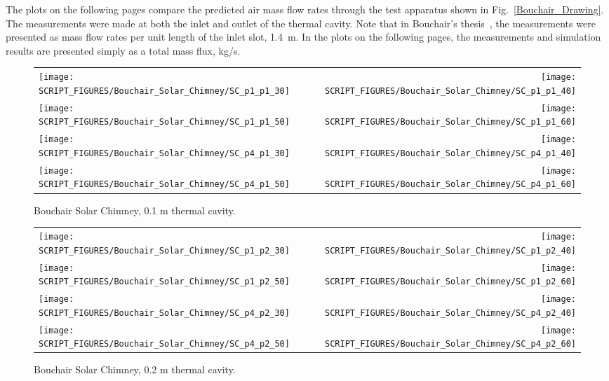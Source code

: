 The plots on the following pages compare the predicted air mass flow rates through the test apparatus shown in Fig.~\ref{Bouchair_Drawing}. The measurements were made at both the inlet and outlet of the thermal cavity. Note that in Bouchair's thesis~\cite{Bouchair:Thesis}, the measurements were presented as mass flow rates per unit length of the inlet slot, 1.4~m. In the plots on the following pages, the measurements and simulation results are presented simply as a total mass flux, kg/s.

\begin{figure}[p]
\begin{tabular*}{\textwidth}{l@{\extracolsep{\fill}}r}
\texttt{[image: SCRIPT\_FIGURES/Bouchair\_Solar\_Chimney/SC\_p1\_p1\_30]} &
\texttt{[image: SCRIPT\_FIGURES/Bouchair\_Solar\_Chimney/SC\_p1\_p1\_40]} \\
\texttt{[image: SCRIPT\_FIGURES/Bouchair\_Solar\_Chimney/SC\_p1\_p1\_50]} &
\texttt{[image: SCRIPT\_FIGURES/Bouchair\_Solar\_Chimney/SC\_p1\_p1\_60]} \\
\texttt{[image: SCRIPT\_FIGURES/Bouchair\_Solar\_Chimney/SC\_p4\_p1\_30]} &
\texttt{[image: SCRIPT\_FIGURES/Bouchair\_Solar\_Chimney/SC\_p4\_p1\_40]} \\
\texttt{[image: SCRIPT\_FIGURES/Bouchair\_Solar\_Chimney/SC\_p4\_p1\_50]} &
\texttt{[image: SCRIPT\_FIGURES/Bouchair\_Solar\_Chimney/SC\_p4\_p1\_60]}
\end{tabular*}
\caption{Bouchair Solar Chimney, 0.1 m thermal cavity.}
\label{Bouchair_p1}
\end{figure}

\begin{figure}[p]
\begin{tabular*}{\textwidth}{l@{\extracolsep{\fill}}r}
\texttt{[image: SCRIPT\_FIGURES/Bouchair\_Solar\_Chimney/SC\_p1\_p2\_30]} &
\texttt{[image: SCRIPT\_FIGURES/Bouchair\_Solar\_Chimney/SC\_p1\_p2\_40]} \\
\texttt{[image: SCRIPT\_FIGURES/Bouchair\_Solar\_Chimney/SC\_p1\_p2\_50]} &
\texttt{[image: SCRIPT\_FIGURES/Bouchair\_Solar\_Chimney/SC\_p1\_p2\_60]} \\
\texttt{[image: SCRIPT\_FIGURES/Bouchair\_Solar\_Chimney/SC\_p4\_p2\_30]} &
\texttt{[image: SCRIPT\_FIGURES/Bouchair\_Solar\_Chimney/SC\_p4\_p2\_40]} \\
\texttt{[image: SCRIPT\_FIGURES/Bouchair\_Solar\_Chimney/SC\_p4\_p2\_50]} &
\texttt{[image: SCRIPT\_FIGURES/Bouchair\_Solar\_Chimney/SC\_p4\_p2\_60]}
\end{tabular*}
\caption{Bouchair Solar Chimney, 0.2 m thermal cavity.}
\label{Bouchair_p2}
\end{figure}

